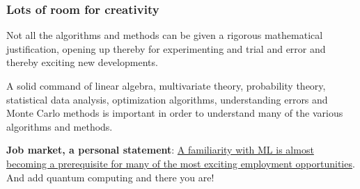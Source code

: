 \documentclass{beamer}
\begin{document}
\begin{frame}
\frametitle{Lots of room for creativity}

\begin{block}{}
Not all the
algorithms and methods can be given a rigorous mathematical
justification, opening up thereby for experimenting
and trial and error and thereby exciting new developments. 
\end{block}

\begin{block}{}
A solid command of linear algebra, multivariate theory, 
probability theory, statistical data analysis, optimization algorithms, 
understanding errors and Monte Carlo methods is important in order to understand many of the 
various algorithms and methods. 
\end{block}

\textbf{Job market, a personal statement}: \href{{https://www.analyticsindiamag.com/top-countries-hiring-most-number-of-artificial-intelligence-machine-learning-experts/}}{A familiarity with ML is almost becoming a prerequisite for many of the most exciting employment opportunities}. And add quantum computing and there you are!
\end{frame}
\end{document}
